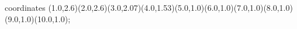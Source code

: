 					coordinates { (1.0,2.6)(2.0,2.6)(3.0,2.07)(4.0,1.53)(5.0,1.0)(6.0,1.0)(7.0,1.0)(8.0,1.0)(9.0,1.0)(10.0,1.0)};